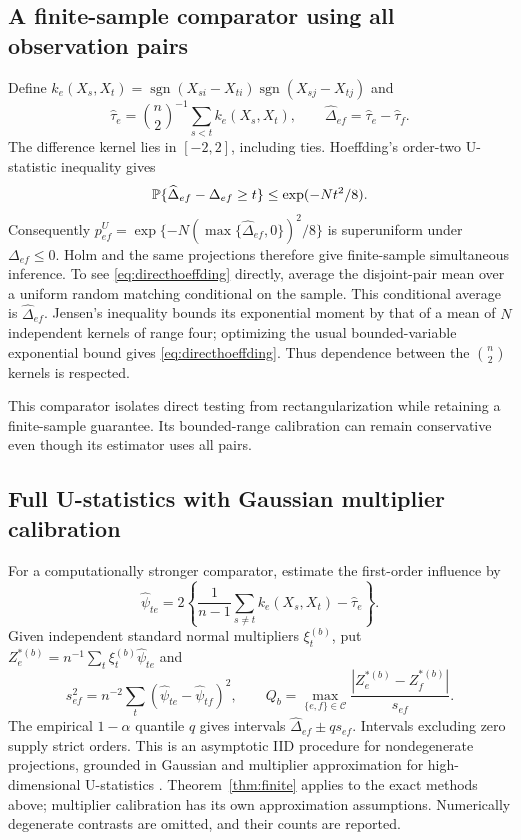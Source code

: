 \subsection{A finite-sample comparator using all observation pairs}
Define $k_e(X_s,X_t)=\operatorname{sgn}(X_{si}-X_{ti})\operatorname{sgn}(X_{sj}-X_{tj})$ and
\[
 \widehat\tau_e={\binom n2}^{-1}\sum_{s<t} k_e(X_s,X_t),\qquad
 \widehat\Delta_{ef}=\widehat\tau_e-\widehat\tau_f.
\]
The difference kernel lies in $[-2,2]$, including ties. Hoeffding's order-two U-statistic inequality \citep{hoeffding1963} gives
\begin{equation}\label{eq:directhoeffding}
 \mathbb P\{\widehat\Delta_{ef}-\Delta_{ef}\ge t\}
 \le \exp(-Nt^2/8).
\end{equation}
Consequently $p^{U}_{ef}=\exp\{-N(\max\{\widehat\Delta_{ef},0\})^2/8\}$ is superuniform under $\Delta_{ef}\le0$. Holm and the same projections therefore give finite-sample simultaneous inference. To see \eqref{eq:directhoeffding} directly, average the disjoint-pair mean over a uniform random matching conditional on the sample. This conditional average is $\widehat\Delta_{ef}$. Jensen's inequality bounds its exponential moment by that of a mean of $N$ independent kernels of range four; optimizing the usual bounded-variable exponential bound gives \eqref{eq:directhoeffding}. Thus dependence between the $\binom n2$ kernels is respected.

This comparator isolates direct testing from rectangularization while retaining a finite-sample guarantee. Its bounded-range calibration can remain conservative even though its estimator uses all pairs.

\subsection{Full U-statistics with Gaussian multiplier calibration}\label{sec:multiplier}
For a computationally stronger comparator, estimate the first-order influence by
\[
 \widehat\psi_{te}=2\left\{\frac1{n-1}\sum_{s\ne t} k_e(X_s,X_t)-\widehat\tau_e\right\}.
\]
Given independent standard normal multipliers $\xi_t^{(b)}$, put $Z_e^{*(b)}=n^{-1}\sum_t\xi_t^{(b)}\widehat\psi_{te}$ and
\[
 s_{ef}^2=n^{-2}\sum_t(\widehat\psi_{te}-\widehat\psi_{tf})^2,\qquad
 Q_b=\max_{\{e,f\}\in\mathcal C}\frac{|Z_e^{*(b)}-Z_f^{*(b)}|}{s_{ef}}.
\]
The empirical $1-\alpha$ quantile $q$ gives intervals $\widehat\Delta_{ef}\pm qs_{ef}$. Intervals excluding zero supply strict orders. This is an asymptotic IID procedure for nondegenerate projections, grounded in Gaussian and multiplier approximation for high-dimensional U-statistics \citep{chen2018,cck2013}. Theorem~\ref{thm:finite} applies to the exact methods above; multiplier calibration has its own approximation assumptions. Numerically degenerate contrasts are omitted, and their counts are reported.

